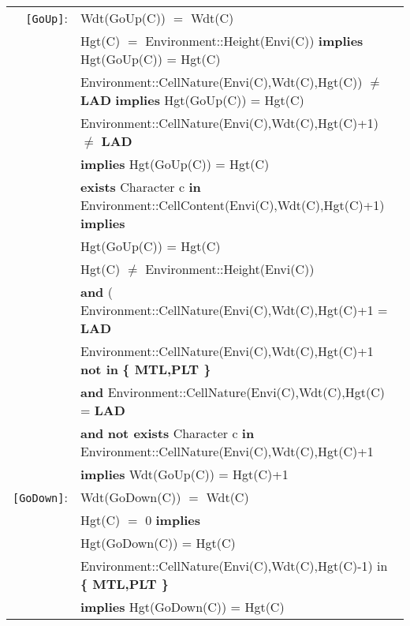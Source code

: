 \documentclass{article}
\begin{document}
\begin{tabular}{rl}
\texttt{[GoUp]}: 

& \textrm{Wdt(GoUp(C))} $=$ \textrm{Wdt(C)} \\
& \textrm{Hgt(C)} $=$ \textrm{Environment::Height(Envi(C))} \textbf{implies} \textrm{Hgt(GoUp(C))} = \textrm{Hgt(C)} \\
& \textrm{Environment::CellNature(Envi(C),Wdt(C),Hgt(C))} $\neq$ \textbf{LAD} \textbf{implies} \textrm{Hgt(GoUp(C))} = \textrm{Hgt(C)} \\
& \textrm{Environment::CellNature(Envi(C),Wdt(C),Hgt(C)+1)} $\neq$ \textbf{LAD}\\
& \quad \textbf{implies} \textrm{Hgt(GoUp(C))} = \textrm{Hgt(C)} \\
& \textbf{exists} \textrm{Character} c \textbf{in} \textrm{Environment::CellContent(Envi(C),Wdt(C),Hgt(C)+1)} \textbf{implies}\\
& \quad \textrm{Hgt(GoUp(C))} = \textrm{Hgt(C)} \\

& \textrm{Hgt(C)} $\neq$ \textrm{Environment::Height(Envi(C))} \\
& \quad \textbf{and} (
    \textrm{Environment::CellNature(Envi(C),Wdt(C),Hgt(C)+1} = \textbf{LAD} \\
& \quad\quad  \textrm{Environment::CellNature(Envi(C),Wdt(C),Hgt(C)+1} \textbf{not in } \textbf{ \{ MTL,PLT \}} \\
& \quad \textbf{and} \textrm{Environment::CellNature(Envi(C),Wdt(C),Hgt(C)} = \textbf{LAD} \\
& \quad \textbf{and} \textbf{not exists} \textrm{Character} c \textbf{in} \textrm{Environment::CellNature(Envi(C),Wdt(C),Hgt(C)+1} \\
& \quad \textbf{implies} \textrm{Wdt(GoUp(C))} = \textrm{Hgt(C)}+1 \\

\texttt{[GoDown]}: 

& \textrm{Wdt(GoDown(C))} $=$ \textrm{Wdt(C)} \\

& \textrm{Hgt(C)} $=$ 0 \textbf{implies} \\
& \quad\textrm{Hgt(GoDown(C))} = \textrm{Hgt(C)} \\

& \textrm{Environment::CellNature(Envi(C),Wdt(C),Hgt(C)-1)} \textrm{in} \textbf{ \{ MTL,PLT \} }  \\
& \quad\textbf{implies} \textrm{Hgt(GoDown(C))} = \textrm{Hgt(C)} \\


\end{tabular}
\end{document}
